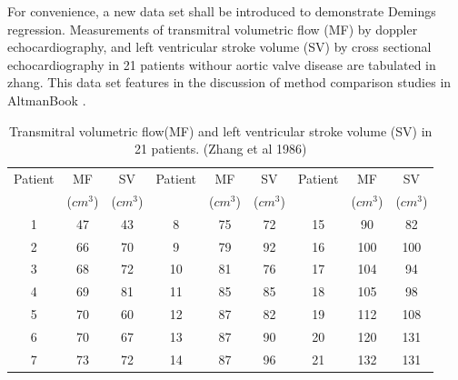 \documentclass[compress]{beamer}        %
\begin{document}
\begin{frame}
For convenience, a new data set shall be introduced to demonstrate
Demings regression. Measurements of transmitral volumetric flow
(MF) by doppler echocardiography, and left ventricular stroke
volume (SV) by cross sectional echocardiography in 21 patients
withour aortic valve disease are tabulated in \alert{zhang}. This
data set features in the discussion of method comparison studies
in \alert[p.398]{AltmanBook} .

\end{frame}
\begin{frame}

\begin{table}[h!]
\begin{center}
\begin{tabular}{|c|c|c||c|c|c||c|c|c|}
  \hline
 Patient & MF  & SV  & Patient & MF  & SV  & Patient & MF  & SV \\
 &($cm^{3}$)&  ($cm^{3}$) & &($cm^{3}$)&  ($cm^{3}$) & &($cm^{3}$)&  ($cm^{3}$)
 \\
  \hline
1 & 47 & 43 &  8 & 75 & 72 &  15 & 90 & 82 \\
  2 & 66 & 70 & 9 & 79 & 92 &  16 & 100 & 100 \\
  3 & 68 & 72 & 10 & 81 & 76 & 17 & 104 & 94 \\
  4 & 69 & 81 & 11 & 85 & 85 &  18 & 105 & 98 \\
  5 & 70 & 60 & 12 & 87 & 82 & 19 & 112 & 108 \\
  6 & 70 & 67 & 13 & 87 & 90 & 20 & 120 & 131 \\
  7 & 73 & 72 & 14 & 87 & 96 &  21 & 132 & 131 \\

   \hline
\end{tabular}
\caption{Transmitral volumetric flow(MF) and left ventricular
stroke volume (SV) in 21 patients. (Zhang et al 1986)}
\end{center}
\end{table}
\newpage

\end{frame}
\end{document}
